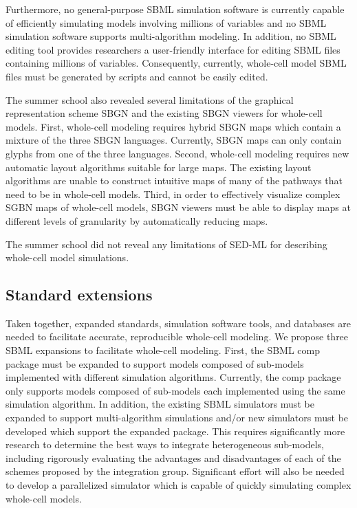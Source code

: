 \documentclass[journal,transmag]{IEEEtran}
\begin{document}
Furthermore, no general-purpose SBML simulation software is currently capable of efficiently simulating models involving millions of variables and no SBML simulation software supports multi-algorithm modeling. In addition, no SBML editing tool provides researchers a user-friendly interface for editing SBML files containing millions of variables. Consequently, currently, whole-cell model SBML files must be generated by scripts and cannot be easily edited.

The summer school also revealed several limitations of the graphical representation scheme SBGN and the existing SBGN viewers for whole-cell models. First, whole-cell modeling requires hybrid SBGN maps which contain a mixture of the three SBGN languages. Currently, SBGN maps can only contain glyphs from one of the three languages. Second, whole-cell modeling requires new automatic layout algorithms suitable for large maps. The existing layout algorithms are unable to construct intuitive maps of many of the pathways that need to be in whole-cell models. Third, in order to effectively visualize complex SGBN maps of whole-cell models, SBGN viewers must be able to display maps at different levels of granularity by automatically reducing maps.

The summer school did not reveal any limitations of SED-ML for describing whole-cell model simulations.

\subsection{Standard extensions}
Taken together, expanded standards, simulation software tools, and databases are needed to facilitate accurate, reproducible whole-cell modeling. We propose three SBML expansions to facilitate whole-cell modeling. First, the SBML comp package must be expanded to support models composed of sub-models implemented with different simulation algorithms. Currently, the comp package only supports models composed of sub-models each implemented using the same simulation algorithm. In addition, the existing SBML simulators must be expanded to support multi-algorithm simulations and/or new simulators must be developed which support the expanded package. This requires significantly more research to determine the best ways to integrate heterogeneous sub-models, including rigorously evaluating the advantages and disadvantages of each of the schemes proposed by the integration group. Significant effort will also be needed to develop a parallelized simulator which is capable of quickly simulating complex whole-cell models.
\end{document}
